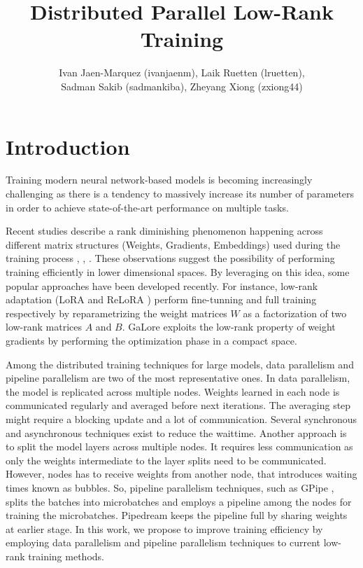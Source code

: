 \documentclass[pdftex,twocolumn,10pt,letterpaper]{article}
\begin{document}
\title{Distributed Parallel Low-Rank Training}
\author{Ivan Jaen-Marquez (ivanjaenm), Laik Ruetten (lruetten), \\ Sadman Sakib (sadmankiba), Zheyang Xiong (zxiong44)}

\date{}


\maketitle

\section{Introduction}

Training modern neural network-based models is becoming increasingly challenging as there is a tendency to massively increase its number of parameters in order to achieve state-of-the-art performance on multiple tasks.

Recent studies describe a rank diminishing phenomenon happening across different matrix structures (Weights, Gradients, Embeddings) used during the training process \cite{huh2023simplicitybias}, \cite{9782552}, \cite{le2022training}. These observations suggest the possibility of performing training efficiently in lower dimensional spaces. By leveraging on this idea, some popular approaches have been developed recently. For instance, low-rank adaptation (LoRA  \cite{Hu2021LoRA} and ReLoRA \cite{lialin2023relora}) perform fine-tunning and full training respectively by reparametrizing the weight matrices $W$ as a factorization of two low-rank matrices $A$ and $B$. GaLore \cite{zhao2024galore} exploits the low-rank property of weight gradients by performing the optimization phase in a compact space.

Among the distributed training techniques for large models, data parallelism and pipeline parallelism are two of the most representative ones. In data parallelism, the model is replicated across multiple nodes. Weights learned in each node is communicated regularly and averaged before next iterations. The averaging step might require a blocking update and a lot of communication. Several synchronous \cite{pytorch-ddp} and asynchronous techniques exist to reduce the waittime. Another approach is to split the model layers across multiple nodes. It requires less communication as only the weights intermediate to the layer splits need to be communicated. However, nodes has to receive weights from another node, that introduces waiting times known as bubbles. So, pipeline parallelism techniques, such as GPipe \cite{gpipe}, splits the batches into microbatches and employs a pipeline among the nodes for training the microbatches. Pipedream \cite{pipedream} keeps the pipeline full by sharing weights at earlier stage. In this work, we propose to improve training efficiency by employing data parallelism and pipeline parallelism techniques to current low-rank training methods.
\end{document}
